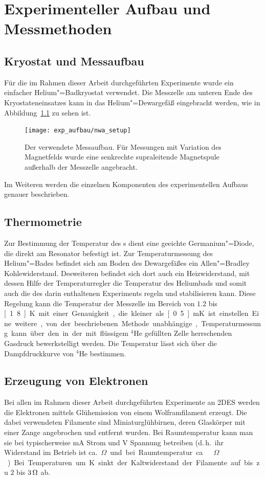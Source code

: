 \chapter{Experimenteller Aufbau und Messmethoden}
	\label{chap:exp}

\section{Kryostat und Messaufbau}

Für die im Rahmen dieser Arbeit durchgeführten Experimente wurde ein einfacher Helium"=Badkryostat verwendet. Die Messzelle am unteren Ende des Kryostateneinsatzes kann in das Helium"=Dewargefäß eingebracht werden, wie in Abbildung~\ref{fig:kryostat} zu sehen ist.

\begin{figure}[h!tbp]
	\begin{center}\texttt{[image: exp\_aufbau/nwa\_setup]}\end{center}
	\caption[Der verwendete Messaufbau]{Der verwendete Messaufbau. Für Messungen mit Variation des Magnetfelds wurde eine senkrechte supraleitende Magnetspule außerhalb der Messzelle angebracht.}
	\label{fig:kryostat}
\end{figure}

Im Weiteren werden die einzelnen Komponenten des experimentellen Aufbaus genauer beschrieben.

\section{Thermometrie}
Zur Bestimmung der Temperatur des \HR s dient eine geeichte Germanium"=Diode, die direkt am Resonator befestigt ist. Zur Temperaturmessung des Helium"=Bades befindet sich am Boden des Dewargefäßes ein Allen"=Bradley Kohlewiderstand. Desweiteren befindet sich dort auch ein Heizwiderstand, mit dessen Hilfe der Temperaturregler die Temperatur des Heliumbads und somit auch die des darin enthaltenen Experiments regeln und stabilisieren kann. Diese Regelung kann die Temperatur der Messzelle im Bereich von $1.2$ bis \unit[1.8]{K} mit einer Genauigkeit, die kleiner als \unit[0.5]{mK} ist einstellen. Eine weitere, von der beschriebenen Methode unabhängige, Temperaturmessung kann über den in der mit flüssigem $^4$He gefüllten Zelle herrschenden Gasdruck bewerkstelligt werden. Die Temperatur lässt sich über die Dampfdruckkurve von $^4$He bestimmen.
 
\section{Erzeugung von Elektronen}
Bei allen im Rahmen dieser Arbeit durchgeführten Experimente an 2DES werden die Elektronen mittels Glühemission von einem Wolframfilament erzeugt. Die dabei verwendeten Filamente sind Miniaturglühbirnen, deren Glaskörper mit einer Zange angebrochen und entfernt wurden. Bei Raumtemperatur kann man sie bei typischerweise \unit[10]{mA} Strom und \unit[1]{V} Spannung betreiben (d.\,h.\ ihr Widerstand im Betrieb ist ca.\ \unit[100]{$\Omega$} und bei Raumtemperatur ca.\ \unit[20]{$\Omega$}). Bei Temperaturen um \unit[4]{K} sinkt der Kaltwiderstand der Filamente auf bis zu $2$ bis $\unit[3]{\Omega}$ ab.

